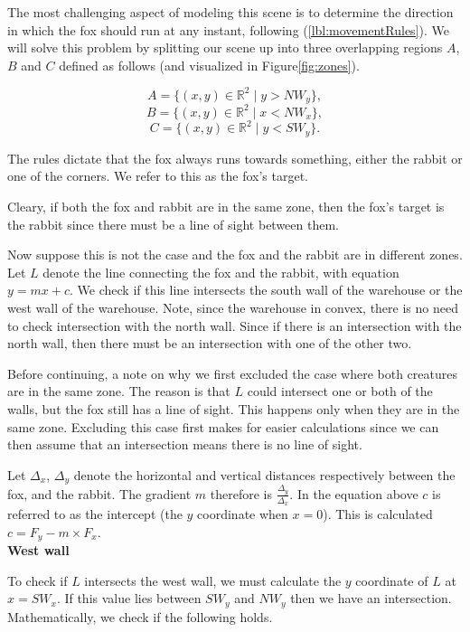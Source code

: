 The most challenging aspect of modeling this scene is to determine the direction in which the fox should run at any instant, following (\ref{lbl:movementRules}). We will solve this problem by splitting our scene up into three overlapping regions $A$, $B$ and $C$ defined as follows (and visualized in Figure\ref{fig:zones}). 

$$ A = \{ (x,y) \in \mathbb{R}^2  \mid  y > NW_y \},  $$
$$ B = \{ (x,y) \in \mathbb{R}^2  \mid  x < NW_x \},  $$
$$ C = \{ (x,y) \in \mathbb{R}^2  \mid  y < SW_y \}.  $$



The rules dictate that the fox always runs towards something, either the rabbit or one of the corners. We refer to this as the fox's target.

Cleary, if both the fox and rabbit are in the same zone, then the fox's target is the rabbit since there must be a line of sight between them. 

Now suppose this is not the case and the fox and the rabbit are in different zones. Let $L$ denote the line connecting the fox and the rabbit, with equation $y = mx  + c$. We check if this line intersects the south wall of the warehouse or the west wall of the warehouse. Note, since the warehouse in convex, there is no need to check intersection with the north wall. Since if there is an intersection with the north wall, then there must be an intersection with one of the other two.

Before continuing, a note on why we first excluded the case where both creatures are in the same zone. The reason is that $L$ could intersect one or both of the walls, but the fox still has a line of sight. This happens only when they are in the same zone. Excluding this case first makes for easier calculations since we can then assume that an intersection means there is no line of sight.

Let $\Delta_x$, $\Delta_y$ denote the horizontal and vertical distances respectively between the fox, and the rabbit. The gradient $m$ therefore is $\frac{\Delta_y}{\Delta_x}$. In the equation above $c$ is referred to as the intercept (the $y$ coordinate when $x = 0$). This is calculated $c = F_y - m \times F_x$. \\

\noindent \textbf{West wall}

To check if $L$ intersects the west wall, we must calculate the $y$ coordinate of $L$ at $x = SW_x$. If this value lies between $SW_y$ and $NW_y$ then we have an intersection. Mathematically, we check if the following holds.

